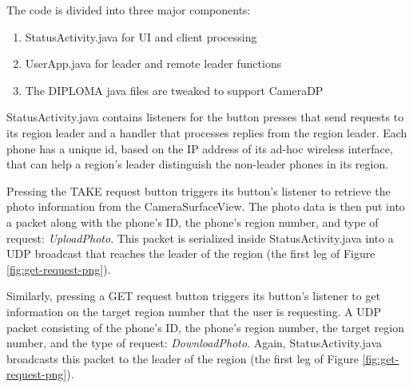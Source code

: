 The code is divided into three major components: 
\begin{enumerate}
\item
StatusActivity.java for UI and client processing
\item
UserApp.java for leader and remote leader functions
\item
The DIPLOMA java files are tweaked to support CameraDP
\end{enumerate}
StatusActivity.java contains listeners for the button presses that send requests to its region leader and a handler that processes replies from the region leader. Each phone has a unique id, based on the IP address of its ad-hoc wireless interface, that can help a region's leader distinguish the non-leader phones in its region.  

Pressing the TAKE request button triggers its button's listener to retrieve the photo information from the CameraSurfaceView. The photo data is then put into a packet along with the phone's ID, the phone's region number, and type of request: {\it UploadPhoto}. This packet is serialized inside StatusActivity.java into a UDP broadcast that reaches the leader of the region (the first leg of Figure \ref{fig:get-request-png}).

Similarly, pressing a GET request button triggers its button's listener to get information on the target region number that the user is requesting. A UDP packet consisting of the phone's ID, the phone's region number, the target region number, and the type of request: {\it DownloadPhoto}. Again, StatusActivity.java broadcasts this packet to the leader of the region (the first leg of Figure \ref{fig:get-request-png}).

